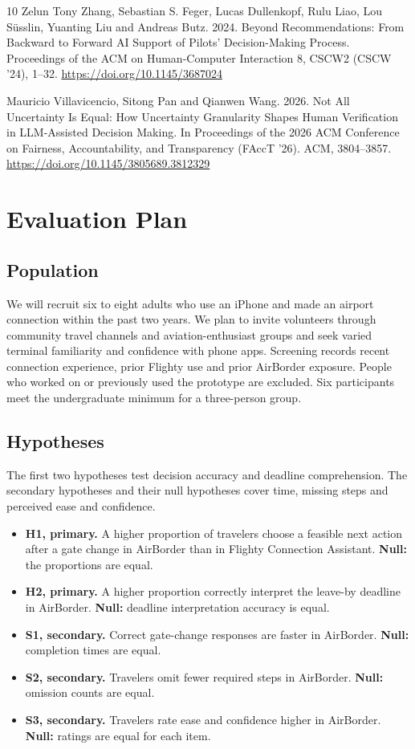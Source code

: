 \documentclass[sigconf,nonacm,balance=false]{acmart}
\begin{document}
\begin{thebibliography}{10}
Zelun Tony Zhang, Sebastian S. Feger, Lucas Dullenkopf, Rulu Liao, Lou S\"{u}sslin, Yuanting Liu and Andreas Butz. 2024. Beyond Recommendations: From Backward to Forward AI Support of Pilots' Decision-Making Process. Proceedings of the ACM on Human-Computer Interaction 8, CSCW2 (CSCW '24), 1--32. \url{https://doi.org/10.1145/3687024}

Mauricio Villavicencio, Sitong Pan and Qianwen Wang. 2026. Not All Uncertainty Is Equal: How Uncertainty Granularity Shapes Human Verification in LLM-Assisted Decision Making. In Proceedings of the 2026 ACM Conference on Fairness, Accountability, and Transparency (FAccT '26). ACM, 3804--3857. \url{https://doi.org/10.1145/3805689.3812329}

\end{thebibliography}

\clearpage
\appendix
\section{Evaluation Plan}\label{sec:eval}\label{app:sessions}
\subsection{Population}
We will recruit six to eight adults who use an iPhone and made an airport connection within the past two years. We plan to invite volunteers through community travel channels and aviation-enthusiast groups and seek varied terminal familiarity and confidence with phone apps. Screening records recent connection experience, prior Flighty use and prior AirBorder exposure. People who worked on or previously used the prototype are excluded. Six participants meet the undergraduate minimum for a three-person group.

\subsection{Hypotheses}
The first two hypotheses test decision accuracy and deadline comprehension. The secondary hypotheses and their null hypotheses cover time, missing steps and perceived ease and confidence.
\begin{itemize}
\item \textbf{H1, primary.} A higher proportion of travelers choose a feasible next action after a gate change in AirBorder than in Flighty Connection Assistant. \textbf{Null:} the proportions are equal.
\item \textbf{H2, primary.} A higher proportion correctly interpret the leave-by deadline in AirBorder. \textbf{Null:} deadline interpretation accuracy is equal.
\item \textbf{S1, secondary.} Correct gate-change responses are faster in AirBorder. \textbf{Null:} completion times are equal.
\item \textbf{S2, secondary.} Travelers omit fewer required steps in AirBorder. \textbf{Null:} omission counts are equal.
\item \textbf{S3, secondary.} Travelers rate ease and confidence higher in AirBorder. \textbf{Null:} ratings are equal for each item.
\end{itemize}
\end{document}
